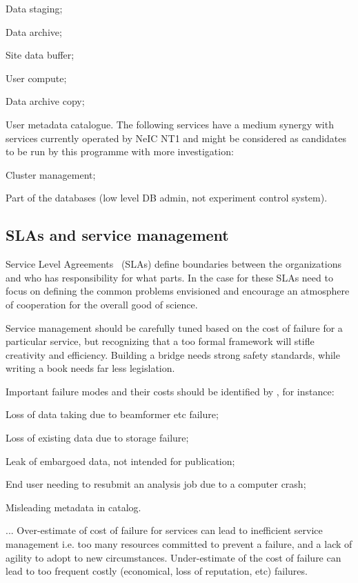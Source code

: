 \documentclass[12pt,a4paper]{article}
\newcommand{\nnt}{NeIC NT1\xspace}
\begin{document}
\bitm
\item Data staging;
\item Data archive;
\item Site data buffer;
\item User compute;
\item Data archive copy;
\item User metadata catalogue.
\eitm
The following services have a medium synergy with services currently operated by \nnt and might be considered as candidates to be run by this programme with more investigation:
\bitm
\item Cluster management;
\item Part of the databases (low level DB admin, not experiment control system).
\eitm 

\subsection{SLAs and service management}
\label{ssec:sla}

Service Level Agreements~\cite{sla} (SLAs) define boundaries between the organizations and who has responsibility for what parts. 
In the case for \ED these SLAs need to focus on defining the common problems envisioned and encourage an atmosphere of cooperation for the overall good of science.

Service management should be carefully tuned based on the cost of failure for a particular service, but recognizing that a too formal framework will stifle creativity and efficiency. 
Building a bridge needs strong safety standards, while writing a book needs far less legislation.

Important failure modes and their costs should be identified by \EC, for instance:
\bitm
\item Loss of data taking due to beamformer etc failure;
\item Loss of existing data due to storage failure;
\item Leak of embargoed data, not intended for publication;
\item End user needing to resubmit an analysis job due to a computer crash;
\item Misleading metadata in catalog.
\item ...
\eitm
Over-estimate of cost of failure for services can lead to inefficient service management i.e. too many resources committed to prevent a failure, and a lack of agility to adopt to new circumstances.
Under-estimate of the cost of failure can lead to too frequent costly (economical, loss of reputation, etc) failures.
\end{document}
